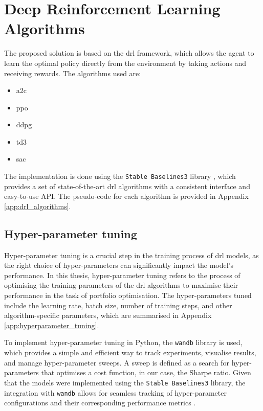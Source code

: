 \section{Deep Reinforcement Learning Algorithms} \label{sec:drl-algorithms}

The proposed solution is based on the \acrshort{drl} framework, which allows the agent to learn the optimal policy directly from the environment by taking actions and receiving rewards. The algorithms used are:
\begin{itemize}
    \item \acrfull{a2c}
    \item \acrfull{ppo}
    \item \acrfull{ddpg}
    \item \acrfull{td3}
    \item \acrfull{sac}
\end{itemize}

The implementation is done using the \texttt{Stable Baselines3} library \cite{Raffin2021}, which provides a set of state-of-the-art \acrshort{drl} algorithms with a consistent interface and easy-to-use API. The pseudo-code for each algorithm is provided in Appendix \ref{app:drl_algorithms}.

\subsection{Hyper-parameter tuning} \label{subsec:hyperparameter-tuning}

Hyper-parameter tuning is a crucial step in the training process of \acrshort{drl} models, as the right choice of hyper-parameters can significantly impact the model's performance. In this thesis, hyper-parameter tuning refers to the process of optimising the training parameters of the \acrshort{drl} algorithms to maximise their performance in the task of portfolio optimisation. The hyper-parameters tuned include the learning rate, batch size, number of training steps, and other algorithm-specific parameters, which are summarised in Appendix \ref{app:hyperparameter_tuning}. 

To implement hyper-parameter tuning in Python, the \texttt{wandb} \cite{wandb} library is used, which provides a simple and efficient way to track experiments, visualise results, and manage hyper-parameter sweeps. A sweep is defined as a search for hyper-parameters that optimises a cost function, in our case, the Sharpe ratio. Given that the models were implemented using the \texttt{Stable Baselines3} library, the integration with \texttt{wandb} allows for seamless tracking of hyper-parameter configurations and their corresponding performance metrics \cite{WeightsBiases2025}.

